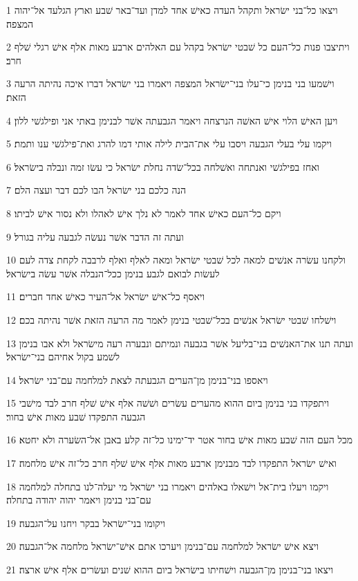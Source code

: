 \par 1 ויצאו כל־בני ישׂראל ותקהל העדה כאישׁ אחד למדן ועד־באר שׁבע וארץ הגלעד אל־יהוה המצפה׃
\par 2 ויתיצבו פנות כל־העם כל שׁבטי ישׂראל בקהל עם האלהים ארבע מאות אלף אישׁ רגלי שׁלף חרב׃
\par 3 וישׁמעו בני בנימן כי־עלו בני־ישׂראל המצפה ויאמרו בני ישׂראל דברו איכה נהיתה הרעה הזאת׃
\par 4 ויען האישׁ הלוי אישׁ האשׁה הנרצחה ויאמר הגבעתה אשׁר לבנימן באתי אני ופילגשׁי ללון׃
\par 5 ויקמו עלי בעלי הגבעה ויסבו עלי את־הבית לילה אותי דמו להרג ואת־פילגשׁי ענו ותמת׃
\par 6 ואחז בפילגשׁי ואנתחה ואשׁלחה בכל־שׂדה נחלת ישׂראל כי עשׂו זמה ונבלה בישׂראל׃
\par 7 הנה כלכם בני ישׂראל הבו לכם דבר ועצה הלם׃
\par 8 ויקם כל־העם כאישׁ אחד לאמר לא נלך אישׁ לאהלו ולא נסור אישׁ לביתו׃
\par 9 ועתה זה הדבר אשׁר נעשׂה לגבעה עליה בגורל׃
\par 10 ולקחנו עשׂרה אנשׁים למאה לכל שׁבטי ישׂראל ומאה לאלף ואלף לרבבה לקחת צדה לעם לעשׂות לבואם לגבע בנימן ככל־הנבלה אשׁר עשׂה בישׂראל׃
\par 11 ויאסף כל־אישׁ ישׂראל אל־העיר כאישׁ אחד חברים׃
\par 12 וישׁלחו שׁבטי ישׂראל אנשׁים בכל־שׁבטי בנימן לאמר מה הרעה הזאת אשׁר נהיתה בכם׃
\par 13 ועתה תנו את־האנשׁים בני־בליעל אשׁר בגבעה ונמיתם ונבערה רעה מישׂראל ולא אבו בנימן לשׁמע בקול אחיהם בני־ישׂראל׃
\par 14 ויאספו בני־בנימן מן־הערים הגבעתה לצאת למלחמה עם־בני ישׂראל׃
\par 15 ויתפקדו בני בנימן ביום ההוא מהערים עשׂרים ושׁשׁה אלף אישׁ שׁלף חרב לבד מישׁבי הגבעה התפקדו שׁבע מאות אישׁ בחור׃
\par 16 מכל העם הזה שׁבע מאות אישׁ בחור אטר יד־ימינו כל־זה קלע באבן אל־השׂערה ולא יחטא׃
\par 17 ואישׁ ישׂראל התפקדו לבד מבנימן ארבע מאות אלף אישׁ שׁלף חרב כל־זה אישׁ מלחמה׃
\par 18 ויקמו ויעלו בית־אל וישׁאלו באלהים ויאמרו בני ישׂראל מי יעלה־לנו בתחלה למלחמה עם־בני בנימן ויאמר יהוה יהודה בתחלה׃
\par 19 ויקומו בני־ישׂראל בבקר ויחנו על־הגבעה׃
\par 20 ויצא אישׁ ישׂראל למלחמה עם־בנימן ויערכו אתם אישׁ־ישׂראל מלחמה אל־הגבעה׃
\par 21 ויצאו בני־בנימן מן־הגבעה וישׁחיתו בישׂראל ביום ההוא שׁנים ועשׂרים אלף אישׁ ארצה׃
